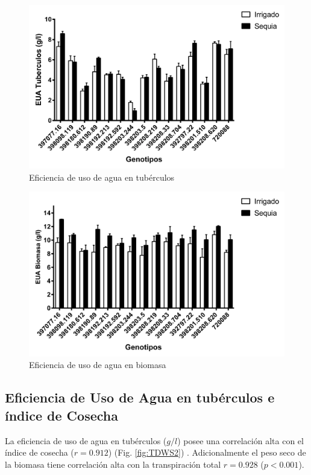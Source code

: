 \documentclass[fleqn,10pt]{Flavio}\usepackage[]{graphicx}\usepackage[]{color}
\begin{document}
\begin{figure}[ht]\centering
\includegraphics[width=\linewidth]{EUAtub}
\caption{Eficiencia de uso de agua en tub\'erculos}
\label{fig:EUAt}
\end{figure}

\begin{figure}[ht]\centering
\includegraphics[width=\linewidth]{EUAbiom}
\caption{Eficiencia de uso de agua en  biomasa}
\label{fig:EUAb}
\end{figure}

\subsection{Eficiencia de Uso de Agua en tub\'erculos e \'indice de Cosecha}

La eficiencia de uso de agua en tub\'erculos ($g/l$) posee una correlaci\'on alta con el \'indice de cosecha ($r = 0.912$) (Fig. \ref{fig:TDWS2}) . Adicionalmente el peso seco de la biomasa tiene correlaci\'on alta con la transpiraci\'on total $r = 0.928$ ($p < 0.001$).
\end{document}
